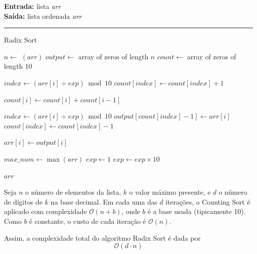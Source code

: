 \documentclass[conference]{IEEEtran}
\begin{document}
\begin{algorithm}[H]
    \raggedright
    \vspace{.1em}
    \textbf{Entrada:} lista \textit{arr} \\
    \textbf{Saída:} lista ordenada \textit{arr} \\
    \vspace{.5em}
    \hrule 
    \caption{Radix Sort}
    \begin{algorithmic}[1]
            \State $n \gets$ $(arr)$
            \State $output \gets$ array of zeros of length $n$
            \State $count \gets$ array of zeros of length $10$
    
                \State $index \gets (arr[i] \div exp) \bmod 10$
                \State $count[index] \gets count[index] + 1$
            \EndFor
    
                \State $count[i] \gets count[i] + count[i - 1]$
            \EndFor
    
                \State $index \gets (arr[i] \div exp) \bmod 10$
                \State $output[count[index] - 1] \gets arr[i]$
                \State $count[index] \gets count[index] - 1$
            \EndFor
    
                \State $arr[i] \gets output[i]$
            \EndFor
        \EndFunction
    
        \State $max\_num \gets \max(arr)$
        \State $exp \gets 1$
            \State {}
            \State $exp \gets exp \times 10$
        \EndWhile
    
        \State \Return $arr$
    \end{algorithmic}
\end{algorithm}

Seja \( n \) o número de elementos da lista, \( k \) o valor máximo presente, e \( d \) o número de dígitos de \( k \) na base decimal. Em cada uma das \( d \) iterações, o Counting Sort é aplicado com complexidade \(\mathcal{O}(n + b)\), onde \( b \) é a base usada (tipicamente 10). Como \( b \) é constante, o custo de cada iteração é \(\mathcal{O}(n)\).

Assim, a complexidade total do algoritmo Radix Sort é dada por
\[
\mathcal{O}(d \cdot n)
\]
\end{document}
